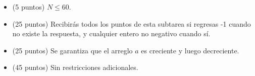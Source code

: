 \documentclass[12pt]{scrartcl}
\begin{document}


    \begin{itemize}
        \item (5 puntos) $N \le 60$.
        \item (25 puntos) Recibirás todos los puntos de esta subtarea si regresas -1 cuando no existe la respuesta, y cualquier entero no negativo cuando sí.
        \item (25 puntos) Se garantiza que el arreglo $a$ es creciente y luego decreciente.
        \item (45 puntos) Sin restricciones adicionales.
    \end{itemize}
\end{document}

